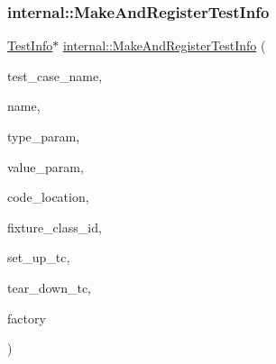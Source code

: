 \subsubsection{\texorpdfstring{internal::MakeAndRegisterTestInfo}{internal::MakeAndRegisterTestInfo}\hspace{0.1cm}{\footnotesize\ttfamily [1/3]}}
{\footnotesize\ttfamily \mbox{\hyperlink{classtesting_1_1_test_info}{Test\+Info}}$\ast$ \mbox{\hyperlink{namespacetesting_1_1internal_a82087d14f1d2e6b1930237a644658d3a}{internal\+::\+Make\+And\+Register\+Test\+Info}} (\begin{DoxyParamCaption}\item[{const char $\ast$}]{test\+\_\+case\+\_\+name,  }\item[{const char $\ast$}]{name,  }\item[{const char $\ast$}]{type\+\_\+param,  }\item[{const char $\ast$}]{value\+\_\+param,  }\item[{\mbox{\hyperlink{structtesting_1_1internal_1_1_code_location}{internal\+::\+Code\+Location}}}]{code\+\_\+location,  }\item[{\mbox{\hyperlink{namespacetesting_1_1internal_a38c435cbab5f8b784e2e7f3356cab242}{internal\+::\+Type\+Id}}}]{fixture\+\_\+class\+\_\+id,  }\item[{\mbox{\hyperlink{classtesting_1_1_test_a5f2a051d1d99c9b784c666c586186cf9}{Test\+::\+Set\+Up\+Test\+Case\+Func}}}]{set\+\_\+up\+\_\+tc,  }\item[{\mbox{\hyperlink{classtesting_1_1_test_aa0f532e93b9f3500144c53f31466976c}{Test\+::\+Tear\+Down\+Test\+Case\+Func}}}]{tear\+\_\+down\+\_\+tc,  }\item[{\mbox{\hyperlink{classtesting_1_1internal_1_1_test_factory_base}{internal\+::\+Test\+Factory\+Base}} $\ast$}]{factory }\end{DoxyParamCaption})\hspace{0.3cm}{\ttfamily [friend]}}

\mbox{\label{classtesting_1_1_test_info_a63d61c7ffd0423b1d3615f0ff5f2040e}} 
